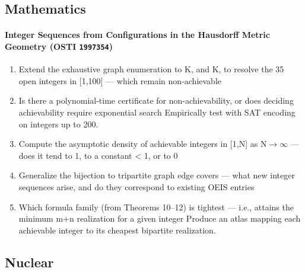 \documentclass[11pt]{article}
\begin{document}
\subsection*{Mathematics}
\paragraph{Integer Sequences from Configurations in the Hausdorff Metric Geometry \textnormal{\small(OSTI \texttt{1997354})}}
\begin{enumerate}[leftmargin=1.6em,itemsep=0.2em,topsep=0.2em,label=Q\arabic*.]
\item Extend the exhaustive graph enumeration to K, and K, to resolve the 35 open integers in [1,100] --- which remain non-achievable
\item Is there a polynomial-time certificate for non-achievability, or does deciding achievability require exponential search Empirically test with SAT encoding on integers up to 200.
\item Compute the asymptotic density of achievable integers in [1,N] as N$\rightarrow$$\infty$ --- does it tend to 1, to a constant \textless{} 1, or to 0
\item Generalize the bijection to tripartite graph edge covers --- what new integer sequences arise, and do they correspond to existing OEIS entries
\item Which formula family (from Theorems 10--12) is tightest --- i.e., attains the minimum m+n realization for a given integer Produce an atlas mapping each achievable integer to its cheapest bipartite realization.
\end{enumerate}
\subsection*{Nuclear}
\end{document}
